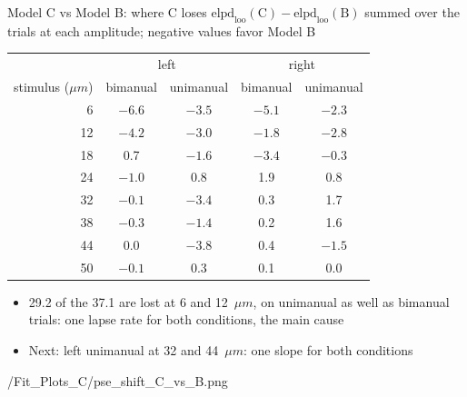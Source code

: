 \begin{frame}{Model C vs Model B: where C loses}
  $\text{elpd}_\text{loo}(\text{C}) - \text{elpd}_\text{loo}(\text{B})$ summed over the trials at
  each amplitude; negative values favor Model B
  \vspace{0.2em}

  \centering\footnotesize
  \renewcommand{\arraystretch}{0.85}
  \begin{tabular}{rcccc}
    \toprule
     & \multicolumn{2}{c}{left} & \multicolumn{2}{c}{right} \\
    stimulus ($\mu m$) & bimanual & unimanual & bimanual & unimanual \\
    \midrule
    6  & $-6.6$ & $-3.5$ & $-5.1$ & $-2.3$ \\
    12 & $-4.2$ & $-3.0$ & $-1.8$ & $-2.8$ \\
    18 & 0.7    & $-1.6$ & $-3.4$ & $-0.3$ \\
    24 & $-1.0$ & 0.8    & 1.9    & 0.8 \\
    32 & $-0.1$ & $-3.4$ & 0.3    & 1.7 \\
    38 & $-0.3$ & $-1.4$ & 0.2    & 1.6 \\
    44 & 0.0    & $-3.8$ & 0.4    & $-1.5$ \\
    50 & $-0.1$ & 0.3    & 0.1    & 0.0 \\
    \bottomrule
  \end{tabular}

  \vspace{0.2em}
  \raggedright
  {\small
  \begin{itemize}
    \item 29.2 of the 37.1 are lost at 6 and 12~$\mu m$, on unimanual as well as bimanual
          trials: one lapse rate for both conditions, the main cause
    \item Next: left unimanual at 32 and 44~$\mu m$: one slope for both conditions
  \end{itemize}}
\end{frame}

  {\plotsC/Fit_Plots_C/pse_shift_C_vs_B.png}

